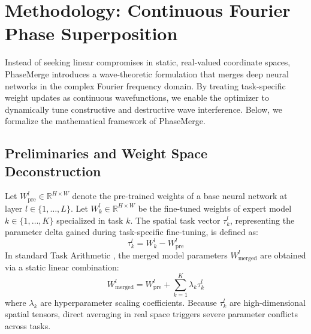 \section{Methodology: Continuous Fourier Phase Superposition}
\label{sec:methodology}

Instead of seeking linear compromises in static, real-valued coordinate spaces, PhaseMerge introduces a wave-theoretic formulation that merges deep neural networks in the complex Fourier frequency domain. By treating task-specific weight updates as continuous wavefunctions, we enable the optimizer to dynamically tune constructive and destructive wave interference. Below, we formalize the mathematical framework of PhaseMerge.

\subsection{Preliminaries and Weight Space Deconstruction}
Let $W_{\text{pre}}^l \in \mathbb{R}^{H \times W}$ denote the pre-trained weights of a base neural network at layer $l \in \{1, \dots, L\}$. Let $W_k^l \in \mathbb{R}^{H \times W}$ be the fine-tuned weights of expert model $k \in \{1, \dots, K\}$ specialized in task $k$. The spatial task vector $\tau_k^l$, representing the parameter delta gained during task-specific fine-tuning, is defined as:
\begin{equation}
    \tau_k^l = W_k^l - W_{\text{pre}}^l
\end{equation}
In standard Task Arithmetic \cite{ilharco2022editing}, the merged model parameters $W^l_{\text{merged}}$ are obtained via a static linear combination:
\begin{equation}
    W^l_{\text{merged}} = W_{\text{pre}}^l + \sum_{k=1}^K \lambda_k \tau_k^l
\end{equation}
where $\lambda_k$ are hyperparameter scaling coefficients. Because $\tau_k^l$ are high-dimensional spatial tensors, direct averaging in real space triggers severe parameter conflicts across tasks.


